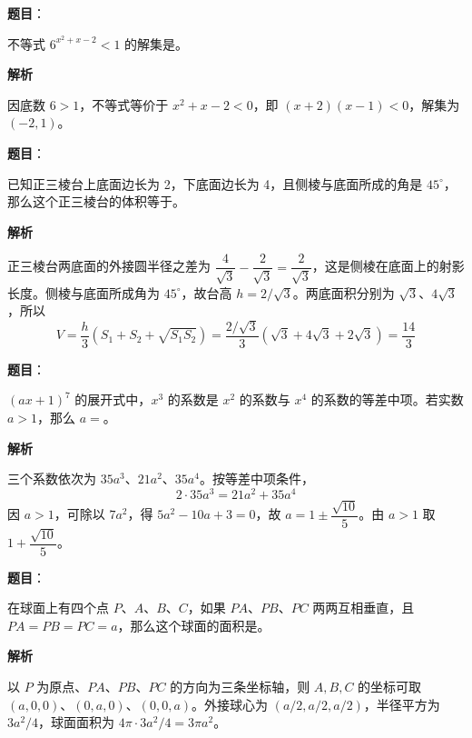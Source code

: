 \begin{answer}

\textbf{题目}：

不等式 $6^{x^2+x-2}<1$ 的解集是\underline{\hspace{8em}}。

\textbf{解析}

因底数 $6>1$，不等式等价于 $x^2+x-2<0$，即 $(x+2)(x-1)<0$，解集为 $(-2,1)$。


\end{answer}
\begin{answer}

\textbf{题目}：

已知正三棱台上底面边长为 2，下底面边长为 4，且侧棱与底面所成的角是 $45^\circ$，那么这个正三棱台的体积等于\underline{\hspace{6em}}。

\textbf{解析}

正三棱台两底面的外接圆半径之差为 $\dfrac4{\sqrt3}-\dfrac2{\sqrt3}=\dfrac2{\sqrt3}$，这是侧棱在底面上的射影长度。侧棱与底面所成角为 $45^\circ$，故台高 $h=2/\sqrt3$。两底面积分别为 $\sqrt3$、$4\sqrt3$，所以
\nopagebreak[4]
\[
V=\frac h3\left(S_1+S_2+\sqrt{S_1S_2}\right)
=\frac{2/\sqrt3}{3}(\sqrt3+4\sqrt3+2\sqrt3)
=\frac{14}3
\]


\end{answer}
\begin{answer}

\textbf{题目}：

$(ax+1)^7$ 的展开式中，$x^3$ 的系数是 $x^2$ 的系数与 $x^4$ 的系数的等差中项。若实数 $a>1$，那么 $a=$\underline{\hspace{6em}}。

\textbf{解析}

三个系数依次为 $35a^3$、$21a^2$、$35a^4$。按等差中项条件，
\nopagebreak[4]
\[
2\cdot35a^3=21a^2+35a^4
\]
因 $a>1$，可除以 $7a^2$，得 $5a^2-10a+3=0$，故 $a=1\pm\dfrac{\sqrt{10}}5$。由 $a>1$ 取 $1+\dfrac{\sqrt{10}}5$。


\end{answer}
\begin{answer}

\textbf{题目}：

在球面上有四个点 $P$、$A$、$B$、$C$，如果 $PA$、$PB$、$PC$ 两两互相垂直，且 $PA=PB=PC=a$，那么这个球面的面积是\underline{\hspace{6em}}。

\textbf{解析}

以 $P$ 为原点、$PA$、$PB$、$PC$ 的方向为三条坐标轴，则 $A,B,C$ 的坐标可取 $(a,0,0)$、$(0,a,0)$、$(0,0,a)$。外接球心为 $(a/2,a/2,a/2)$，半径平方为 $3a^2/4$，球面面积为 $4\pi\cdot3a^2/4=3\pi a^2$。


\end{answer}
